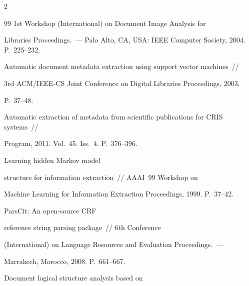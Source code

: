 \begin{multicols}{2}
{{\begin{thebibliography}{99}
1st  Workshop (International) on Document Image Analysis for 


Libraries Proceedings.~--- Palo Alto, CA, USA: IEEE Computer Society, 2004. P.~225--232.


    






Automatic document metadata extraction using support vector machines~// 


3rd ACM/IEEE-CS Joint Conference on Digital Libraries Proceedings, 2003. 


P.~37--48.









Automatic extraction of metadata from scientific publications for CRIS systems~// 


Program, 2011. Vol.~45. Iss.~4. P.~376--396.







 Learning hidden Markov model 


structure for information extraction~// AAAI~99 Workshop on 


Machine Learning for Information Extraction Proceedings, 1999. P.~37--42.







 ParsCit: An open-source CRF 


reference string parsing package~// 6th Conference 


(International) on Language Resources and Evaluation Proceedings.~---


Marrakech, Morocco, 2008. P.~661--667.










 Document logical structure analysis based on 



\end{thebibliography}}}
\end{multicols}
